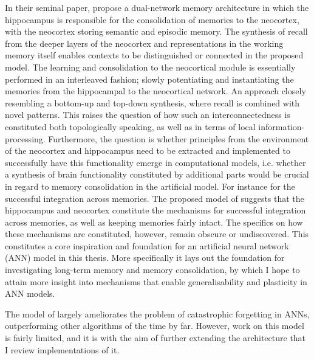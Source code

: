 In their seminal paper, \cite{McClelland1995} propose a dual-network memory architecture in which the hippocampus is responsible for the consolidation of memories to the neocortex, with the neocortex storing semantic and episodic memory. The synthesis of recall from the deeper layers of the neocortex and representations in the working memory itself enables contexts to be distinguished or connected in the proposed model. The learning and consolidation to the neocortical module is essentially performed in an interleaved fashion; slowly potentiating and instantiating the memories from the hippocampal to the neocortical network. An approach closely resembling a bottom-up and top-down synthesis, where recall is combined with novel patterns. This raises the question of how such an interconnectedness is constituted both topologically speaking, as well as in terms of local information-processing. Furthermore, the question is whether principles from the environment of the neocortex and hippocampus need to be extracted and implemented to successfully have this functionality emerge in computational models, i.e. whether a synthesis of brain functionality constituted by additional parts would be crucial in regard to memory consolidation in the artificial model. For instance for the successful integration across memories. The proposed model of \citep{McClelland1995} suggests that the hippocampus and neocortex constitute the mechanisms for successful integration across memories, as well as keeping memories fairly intact. The specifics on how these mechanisms are constituted, however, remain obscure or undiscovered. This constitutes a core inspiration and foundation for an artificial neural network (ANN) model in this thesis. More specifically it lays out the foundation for investigating long-term memory and memory consolidation, by which I hope to attain more insight into mechanisms that enable generalisability and plasticity in ANN models.

The model of \cite{McClelland1995} largely ameliorates the problem of catastrophic forgetting in ANNs, outperforming other algorithms of the time by far. However, work on this model is fairly limited, and it is with the aim of further extending the architecture that I review implementations of it.

